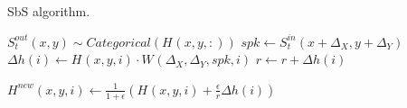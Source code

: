 \begin{algorithm}[h!]
	\label{alg:sbs}
	\caption{SbS algorithm.}
	
	\begin{algorithmic}[1]
				\STATE $S^{out}_t(x, y) \sim Categorical( H^{}(x, y, :) ) $
					\STATE $spk \leftarrow S^{in}_t(x + \Delta_X , y + \Delta_Y)$
						\STATE $\Delta h(i)
						\leftarrow H^{}(x, y,  i) \cdot W^{}(\Delta_X, \Delta_Y, spk, i)$
						\STATE $r \leftarrow r + \Delta h(i)$
					\ENDFOR
					
						\STATE $H^{new}(x, y, i) \leftarrow \frac{1}{1+\epsilon} \left( H^{}(x, y, i) + \frac{\epsilon}{r} \Delta h(i) \right) $              
					\ENDFOR
				\ENDFOR
			\ENDFOR
		\ENDFOR
	\end{algorithmic} 
\end{algorithm}


